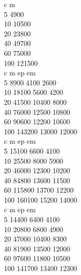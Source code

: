 
    c     m        \\
    5     4900      \\
    10    10500     \\
    20    23800     \\
    40    49700     \\
    60    75000     \\
    100   121500    \\

    c     m        ep      em     \\
    5     8900     4100    2600   \\
    10    18100    5600    4200   \\
    20    41500    10400   8000   \\
    40    76000    12500   10800  \\
    60    90600    12200   10600  \\
    100   143200   13000   12000  \\

    c     m        ep      em     \\
    5     15100    6600    4100   \\
    10    25500    8000    5900   \\
    20    46000    12300   10200  \\
    40    84800    13600   11500  \\
    60    115800   13700   12200  \\
    100   160100   15200   14000  \\

    c     m        ep      em     \\
    5     14400    6400    4100   \\
    10    20800    6800    4900   \\
    20    47000    10400   8300   \\
    40    81900    13500   12000  \\
    60    97600    11800   10500  \\
    100   141700   13400   12300  \\

